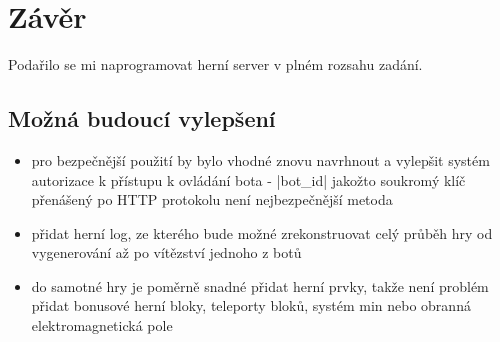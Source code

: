 
\section{Závěr}

Podařilo se mi naprogramovat herní server v plném rozsahu zadání.

\subsection{Možná budoucí vylepšení}

\begin{itemize}
 \item pro bezpečnější použití by bylo vhodné znovu navrhnout a vylepšit systém autorizace k přístupu k ovládání bota - \ic|bot_id| jakožto soukromý klíč přenášený po HTTP protokolu není nejbezpečnější metoda
 \item přidat herní log, ze kterého bude možné zrekonstruovat celý průběh hry od vygenerování až po vítězství jednoho z botů  
 \item do samotné hry je poměrně snadné přidat herní prvky, takže není problém přidat bonusové herní bloky, teleporty bloků, systém min nebo obranná elektromagnetická pole
\end{itemize}

